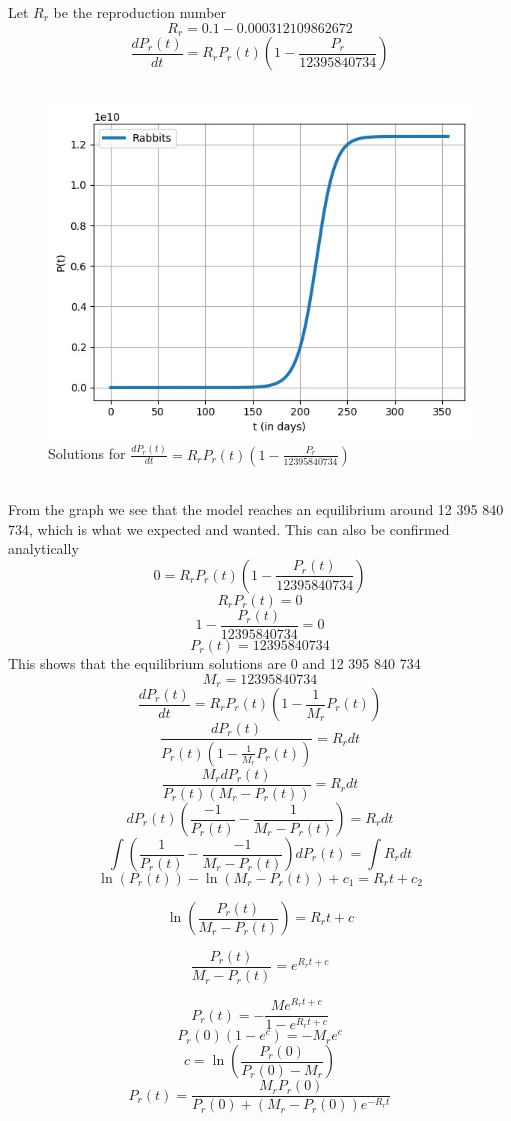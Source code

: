 \documentclass{article}
\begin{document}
Let $R_r$ be the reproduction number
$$
R_r = 0.1 - 0.000312109862672
$$
$$
\frac{dP_r(t)}{dt} = R_rP_r(t)(1-\frac{P_r}{12 395 840 734})
$$
\\
\begin{figure}[hb]
	\centering
	\includegraphics[scale=0.6]{Pictures/logis}
	\caption{Solutions for $\frac{dP_r(t)}{dt} = R_rP_r(t)(1-\frac{P_r}{12 395 840 734})$ }
	\label{fig:unr_rabbitts}
\end{figure}
\\
From the graph we see that the model reaches an equilibrium around 12 395 840 734, which is what we expected and wanted. This can also be confirmed analytically 
$$
0= R_rP_r(t)(1-\frac{P_r(t)}{12 395 840 734})
$$
$$
R_rP_r(t) = 0
$$
$$
1-\frac{P_r(t)}{12 395 840 734} = 0
$$
$$
P_r(t) = 12 395 840 734
$$
This shows that the equilibrium solutions are 0 and 12 395 840 734
$$
M_r = 12 395 840 734 
$$
$$
\frac{dP_r(t)}{dt} = R_rP_r(t)(1 - \frac{1}{M_r}P_r(t))
$$
$$
\frac{dP_r(t)}{P_r(t)(1 - \frac{1}{M_r}P_r(t))} = R_rdt
$$
$$
\frac{M_rdP_r(t)}{P_r(t)(M_r - P_r(t))} = R_rdt
$$
$$
dP_r(t)(\frac{-1}{P_r(t)} - \frac{1}{M_r -P_r(t)})   = R_rdt
$$
$$
\int{(\frac{1}{P_r(t)} - \frac{-1}{M_r -P_r(t)})dP_r(t) }  =\int{ R_r}dt
$$
$$
\ln(P_r(t)) - \ln(M_r -P_r(t)) + c_1 = R_rt +c_2
$$

$$
 \ln(\frac{P_r(t)}{M_r -P_r(t)})  = R_rt +c
$$

$$
\frac{P_r(t)}{M_r -P_r(t)}= e^{R_rt +c}
$$

$$
P_r(t) = - \frac{Me^{R_rt +c}}{1 - e^{R_rt +c}}
$$
$$
P_r(0)(1 - e^{c}) = -M_re^{c}
$$
$$
c = \ln(\frac{P_r(0)}{P_r(0)-M_r})
$$
$$
P_r(t) =  \frac{M_rP_r(0)}{P_r(0)+(M_r - P_r(0))e^{-R_rt}}
$$
\end{document}
